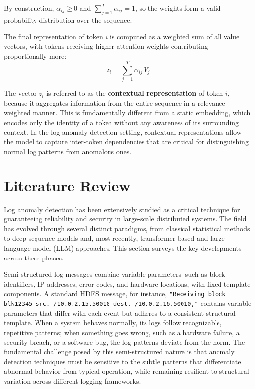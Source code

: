 By construction, $\alpha_{ij} \geq 0$ and $\sum_{j=1}^{T} \alpha_{ij} = 1$, so the weights form a valid probability distribution over the sequence.


The final representation of token $i$ is computed as a weighted sum of all value vectors, with tokens receiving higher attention weights contributing proportionally more:
\begin{equation}
z_i = \sum_{j=1}^{T} \alpha_{ij}\, V_j
\end{equation}

The vector $z_i$ is referred to as the \textbf{contextual representation} of token $i$, because it aggregates information from the entire sequence in a relevance-weighted manner. This is fundamentally different from a static embedding, which encodes only the identity of a token without any awareness of its surrounding context. In the log anomaly detection setting, contextual representations allow the model to capture inter-token dependencies that are critical for distinguishing normal log patterns from anomalous ones.
\section{Literature Review}
\label{sec:lad-litreview}

Log anomaly detection has been extensively studied as a critical technique for guaranteeing reliability and security in large-scale distributed systems. The field has evolved through several distinct paradigms, from classical statistical methods to deep sequence models and, most recently, transformer-based and large language model (LLM) approaches. This section surveys the key developments across these phases.

Semi-structured log messages combine variable parameters, such as block identifiers, IP addresses, error codes, and hardware locations, with fixed template components. A standard HDFS message, for instance, \texttt{"Receiving block blk12345 src: /10.0.2.15:50010 dest: /10.0.2.16:50010,"} contains variable parameters that differ with each event but adheres to a consistent structural template. When a system behaves normally, its logs follow recognizable, repetitive patterns; when something goes wrong, such as a hardware failure, a security breach, or a software bug, the log patterns deviate from the norm. The fundamental challenge posed by this semi-structured nature is that anomaly detection techniques must be sensitive to the subtle patterns that differentiate abnormal behavior from typical operation, while remaining resilient to structural variation across different logging frameworks.

